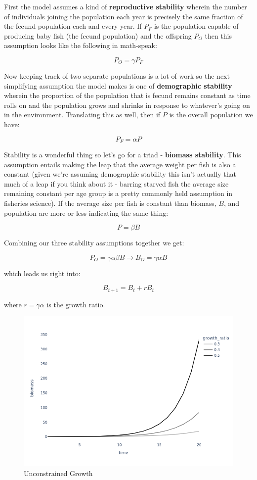 \documentclass[11pt,a5paper]{book}
\begin{document}
First the model assumes a kind of \textbf{reproductive stability} wherein the number of individuals joining the population each year is precisely the same fraction of the fecund population each and every year. If $P_F$ is the population capable of producing baby fish (the fecund population) and the offspring $P_O$ then this assumption looks like the following in math-speak:

$$P_O = \gamma P_F$$

Now keeping track of two separate populations is a lot of work so the next simplifying assumption the model makes is one of \textbf{demographic stability} wherein the proportion of the population that is fecund remains constant as time rolls on and the population grows and shrinks in response to whatever's going on in the environment. Translating this as well, then if $P$ is the overall population we have:

$$P_F = \alpha P$$

Stability is a wonderful thing so let's go for a triad - \textbf{biomass stability}. This assumption entails making the leap that the average weight per fish is also a constant (given we're assuming demographic stability this isn't actually that much of a leap if you think about it - barring starved fish the average size remaining constant per age group is a pretty commonly held assumption in fisheries science). If the average size per fish is constant than biomass, $B$, and population are more or less indicating the same thing:

$$P = \beta B$$

Combining our three stability assumptions together we get:

$$P_O = \gamma \alpha \beta B \rightarrow B_O = \gamma \alpha B $$

which leads us right into:

$$B_{t+1} = B_{t} + rB_t$$

where $r=\gamma \alpha$ is the growth ratio. 
\newline

\begin{figure}[h!] 
  \includegraphics[width=\linewidth]{notebooks/SurplusModels/exponential_growth.png}
  \caption{Unconstrained Growth}
  \label{fig:unconstrained_growth}
\end{figure}
\end{document}
